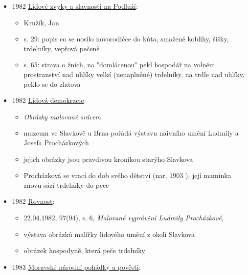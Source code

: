 \begin{itemize}
  \begin{itemize}
  \tightlist
  \item
    s. 11, článek \emph{Horácký Masopust}, 
  \item
    točné čtvrtek byl den, kdy se smažily a pekly šišky, křupance,
    křehotiny, koblihy, někde taky trdelníky
  \item
    točným se nazýval nejen proto, že se hospodyňky točily kolem jídla,
    ale taky proto, že v místním nářeší znamená točné tučné
  \end{itemize}
\item
  1982
  \href{https://ceskadigitalniknihovna.cz/uuid/uuid:55d93f60-3319-11e8-8cf8-005056827e52}{Lidové
  zvyky a slavnosti na Podluží}:

  \begin{itemize}
  \tightlist
  \item
    Kružík, Jan
  \item
    s. 29: popis co se nosilo novorodičce do kúta, smažené koblihy,
    šišky, trdelníky, vepřová pečeně
  \item
    s. 65: strava o žních, na "domlácenou" pekl hospodář na volném
    prostranství nad uhlíky velké (nenaplněné) trdelníky, na trdle nad
    uhlíky, peklo se do zlatova
  \end{itemize}
\item
  1982
  \href{https://www.digitalniknihovna.cz/mzk/uuid/uuid:9c899140-294e-11e9-a347-005056825209}{Lidová
  demokracie}:

  \begin{itemize}
  \tightlist
  \item
    \emph{Obrázky malované srdcem}
  \item
    muzeum ve Slavkově u Brna  pořádá
    výstavu naivního umění Ludmily a Josefa Procházkových
  \item
    jejich obrázky jsou pravdivou kronikou starýho Slavkova
  \item
    Procházková se vrací do dob svého dětství (nar. 1903
     ), její maminka znovu sází trdelníky do pece
  \end{itemize}
\item
  1982
  \href{https://ndk.cz/uuid/uuid:a68a5380-1aa3-11f0-933f-005056825209}{Rovnost}:

  \begin{itemize}
  \tightlist
  \item
    22.04.1982, 97(94), s. 6, \emph{Malované vyprávění Ludmily
    Procházkové}, 
  \item
    výstava obrázků malířky lidového umění z okolí Slavkova
  \item
    obrázek hospodyně, která peče trdelníky
  \end{itemize}
\item
  1983
  \href{https://ceskadigitalniknihovna.cz/uuid/uuid:630563b0-2c45-11e3-b62e-005056825209}{Moravské
  národní pohádky a pověsti}:


\end{itemize}
